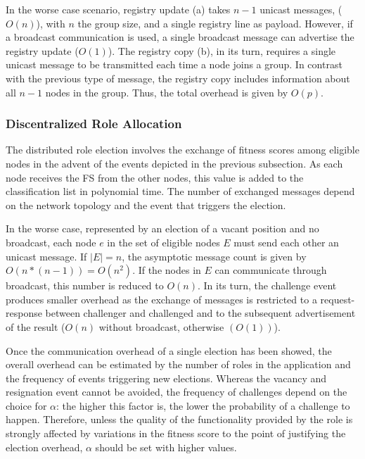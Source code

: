 In the worse case scenario, registry update (a) takes $n-1$ unicast messages, ($O(n)$), with $n$ the group size, and a single registry line as payload. However, if a broadcast communication is used, a single broadcast message can advertise the registry update ($O(1)$).
The registry copy (b), in its turn, requires a single unicast message to be transmitted each time a node joins a group. In contrast with the previous type of message, the registry copy includes information about all $n-1$ nodes in the group. Thus, the total overhead is given by $O(p)$.

\subsubsection{\textbf{Discentralized Role Allocation}} 


The distributed role election involves the exchange of fitness scores among eligible nodes in the advent of the events depicted in the previous subsection. As each node receives the FS from the other nodes, this value is added to the classification list in polynomial time. The number of exchanged messages depend on the network topology and the event that triggers the election. 

In the worse case, represented by an election of a vacant position and no broadcast, each node $e$ in the set of eligible nodes $E$ must send each other an unicast message. If $|E| = n$, the asymptotic message count is given by $O(n * (n-1)) = O(n^2)$. If the nodes in $E$ can communicate through broadcast, this number is reduced to $O(n)$. In its turn, the challenge event produces smaller overhead as the exchange of messages is restricted to a request-response between challenger and challenged and to the subsequent advertisement of the result ($O(n)$ without broadcast, otherwise $(O(1))$).

Once the communication overhead of a single election has been showed, the overall overhead can be estimated by the number of roles in the application and the frequency of events triggering new elections. Whereas the vacancy and resignation event cannot be avoided, the frequency of  challenges depend on the choice for $\alpha$: the higher this factor is, the lower the probability of a challenge to happen. Therefore, unless the quality of the functionality provided by the role is strongly affected by variations in the fitness score to the point of justifying the election overhead, $\alpha$ should be set with higher values. 

